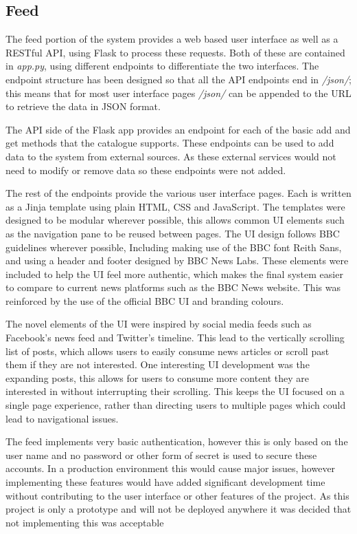 \documentclass[12pt,titlepage]{article}
\begin{document}
  \subsection{Feed}

  The feed portion of the system provides a web based user interface as well as
  a RESTful API, using Flask to process these requests. Both of these are
  contained in \textit{app.py}, using different endpoints to differentiate the
  two interfaces. The endpoint structure has been designed so that all the API
  endpoints end in \textit{/json/}; this means that for most user interface
  pages \textit{/json/} can be appended to the URL to retrieve the data in JSON
  format.

  The API side of the Flask app provides an endpoint for each of the basic add
  and get methods that the catalogue supports. These endpoints can be used to
  add data to the system from external sources. As these external services would
  not need to modify or remove data so these endpoints were not added.

  The rest of the endpoints provide the various user interface pages. Each is
  written as a Jinja template using plain HTML, CSS and JavaScript. The
  templates were designed to be modular wherever possible, this allows common UI
  elements such as the navigation pane to be reused between pages. The UI design
  follows BBC guidelines wherever possible, Including making use of the BBC font
  Reith Sans, and using a header and footer designed by BBC News Labs. These
  elements were included to help the UI feel more authentic, which makes the
  final system easier to compare to current news platforms such as the BBC News
  website. This was reinforced by the use of the official BBC UI and branding
  colours.

  The novel elements of the UI were inspired by social media feeds such as
  Facebook's news feed and Twitter's timeline. This lead to the vertically
  scrolling list of posts, which allows users to easily consume news articles or
  scroll past them if they are not interested. One interesting UI development
  was the expanding posts, this allows for users to consume more content they
  are interested in without interrupting their scrolling. This keeps the UI
  focused on a single page experience, rather than directing users to multiple
  pages which could lead to navigational issues.

  The feed implements very basic authentication, however this is only based on
  the user name and no password or other form of secret is used to secure these
  accounts. In a production environment this would cause major issues, however
  implementing these features would have added significant development time
  without contributing to the user interface or other features of the project.
  As this project is only a prototype and will not be deployed anywhere it was
  decided that not implementing this was acceptable
\end{document}
